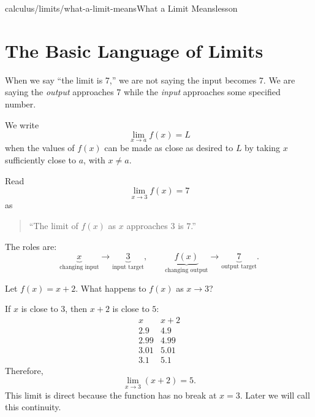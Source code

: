 \begin{webpage}{calculus/limits/what-a-limit-means}{What a Limit Means}{lesson}
\section{The Basic Language of Limits}


\begin{bgconcept}
When we say ``the limit is 7,'' we are not saying the input becomes 7. We are saying the \emph{output} approaches 7 while the \emph{input} approaches some specified number.
\end{bgconcept}

\begin{bgdefinition}
We write
\[
  \boxed{\lim_{x\to a}f(x)=L}
\]
when the values of \(f(x)\) can be made as close as desired to \(L\) by taking \(x\) sufficiently close to \(a\), with \(x\ne a\).
\end{bgdefinition}

Read
\[
  \lim_{x\to3}f(x)=7
\]
as

\begin{quote}
``The limit of \(f(x)\) as \(x\) approaches \(3\) is \(7\).''
\end{quote}

The roles are:
\[
\underbrace{x}_{\text{changing input}}
\to
\underbrace{3}_{\text{input target}},
\qquad
\underbrace{f(x)}_{\text{changing output}}
\to
\underbrace{7}_{\text{output target}}.
\]

\begin{bgguided}[title={A limit with no hole}]
Let \(f(x)=x+2\). What happens to \(f(x)\) as \(x\to3\)?

\begin{bgsolution}
If \(x\) is close to \(3\), then \(x+2\) is close to \(5\):
\[
\begin{array}{c|c}
 x & x+2\\
\hline
2.9&4.9\\
2.99&4.99\\
3.01&5.01\\
3.1&5.1
\end{array}
\]
Therefore,
\[
  \boxed{\lim_{x\to3}(x+2)=5}.
\]
This limit is direct because the function has no break at \(x=3\). Later we will call this continuity.
\end{bgsolution}
\end{bgguided}


\end{webpage}

